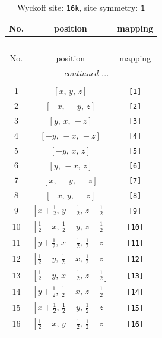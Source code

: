 \documentclass[fleqn,8pt]{jsarticle}
\begin{document}
\begin{longtable}{ccc}
\caption{Wyckoff site: {\tt 16k}, site symmetry: {\tt 1}}
 \\
 \hline \hline
No. & position & mapping \\ \hline \endfirsthead

\multicolumn{2}{l}{\tablename\ \thetable{}} \\
 \hline \hline
No. & position & mapping \\ \hline \endhead

 \hline \hline
\multicolumn{2}{r}{\footnotesize\it continued ...} \\ \endfoot

 \hline \hline
\multicolumn{2}{r}{} \\ \endlastfoot

1 & $\left[ x,\, y,\, z \right]$ & {\tt [1]} \\ \hline
2 & $\left[ - x,\, - y,\, z \right]$ & {\tt [2]} \\ \hline
3 & $\left[ y,\, x,\, - z \right]$ & {\tt [3]} \\ \hline
4 & $\left[ - y,\, - x,\, - z \right]$ & {\tt [4]} \\ \hline
5 & $\left[ - y,\, x,\, z \right]$ & {\tt [5]} \\ \hline
6 & $\left[ y,\, - x,\, z \right]$ & {\tt [6]} \\ \hline
7 & $\left[ x,\, - y,\, - z \right]$ & {\tt [7]} \\ \hline
8 & $\left[ - x,\, y,\, - z \right]$ & {\tt [8]} \\ \hline
9 & $\left[ x + \frac{1}{2},\, y + \frac{1}{2},\, z + \frac{1}{2} \right]$ & {\tt [9]} \\ \hline
10 & $\left[ \frac{1}{2} - x,\, \frac{1}{2} - y,\, z + \frac{1}{2} \right]$ & {\tt [10]} \\ \hline
11 & $\left[ y + \frac{1}{2},\, x + \frac{1}{2},\, \frac{1}{2} - z \right]$ & {\tt [11]} \\ \hline
12 & $\left[ \frac{1}{2} - y,\, \frac{1}{2} - x,\, \frac{1}{2} - z \right]$ & {\tt [12]} \\ \hline
13 & $\left[ \frac{1}{2} - y,\, x + \frac{1}{2},\, z + \frac{1}{2} \right]$ & {\tt [13]} \\ \hline
14 & $\left[ y + \frac{1}{2},\, \frac{1}{2} - x,\, z + \frac{1}{2} \right]$ & {\tt [14]} \\ \hline
15 & $\left[ x + \frac{1}{2},\, \frac{1}{2} - y,\, \frac{1}{2} - z \right]$ & {\tt [15]} \\ \hline
16 & $\left[ \frac{1}{2} - x,\, y + \frac{1}{2},\, \frac{1}{2} - z \right]$ & {\tt [16]} \\
\end{longtable}
\end{document}
